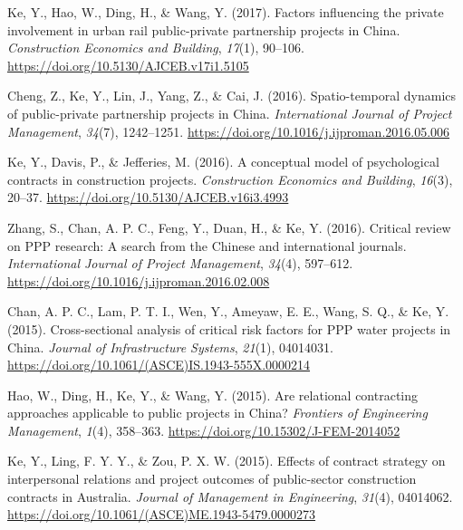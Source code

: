 \documentclass[11pt,a4paper]{report} %
\begin{document}
\begin{tablist}
        \item[2017] \tab{}Ke, Y., Hao, W., Ding, H., \& Wang, Y. (2017). Factors influencing the private involvement in urban rail public-private partnership projects in China. \textit{Construction Economics and Building}, \textit{17}(1), 90--106. \href{https://doi.org/10.5130/AJCEB.v17i1.5105}{https://doi.org/10.5130/AJCEB.v17i1.5105}
        
        \item[2016] \tab{}Cheng, Z., Ke, Y., Lin, J., Yang, Z., \& Cai, J. (2016). Spatio-temporal dynamics of public-private partnership projects in China. \textit{International Journal of Project Management}, \textit{34}(7), 1242--1251. \href{https://doi.org/10.1016/j.ijproman.2016.05.006}{https://doi.org/10.1016/j.ijproman.2016.05.006}
        
        \item[2016] \tab{}Ke, Y., Davis, P., \& Jefferies, M. (2016). A conceptual model of psychological contracts in construction projects. \textit{Construction Economics and Building}, \textit{16}(3), 20--37. \href{https://doi.org/10.5130/AJCEB.v16i3.4993}{https://doi.org/10.5130/AJCEB.v16i3.4993}
        
        \item[2016] \tab{}Zhang, S., Chan, A. P. C., Feng, Y., Duan, H., \& Ke, Y. (2016). Critical review on PPP research: A search from the Chinese and international journals. \textit{International Journal of Project Management}, \textit{34}(4), 597--612. \href{https://doi.org/10.1016/j.ijproman.2016.02.008}{https://doi.org/10.1016/j.ijproman.2016.02.008}
        
        \item[2015] \tab{}Chan, A. P. C., Lam, P. T. I., Wen, Y., Ameyaw, E. E., Wang, S. Q., \& Ke, Y. (2015). Cross-sectional analysis of critical risk factors for PPP water projects in China. \textit{Journal of Infrastructure Systems}, \textit{21}(1), 04014031. \href{https://doi.org/10.1061/(ASCE)IS.1943-555X.0000214}{https://doi.org/10.1061/(ASCE)IS.1943-555X.0000214}
        
        \item[2015] \tab{}Hao, W., Ding, H., Ke, Y., \& Wang, Y. (2015). Are relational contracting approaches applicable to public projects in China? \textit{Frontiers of Engineering Management}, \textit{1}(4), 358--363. \href{https://doi.org/10.15302/J-FEM-2014052}{https://doi.org/10.15302/J-FEM-2014052}
        
        \item[2015] \tab{}Ke, Y., Ling, F. Y. Y., \& Zou, P. X. W. (2015). Effects of contract strategy on interpersonal relations and project outcomes of public-sector construction contracts in Australia. \textit{Journal of Management in Engineering}, \textit{31}(4), 04014062. \href{https://doi.org/10.1061/(ASCE)ME.1943-5479.0000273}{https://doi.org/10.1061/(ASCE)ME.1943-5479.0000273}
        

\end{tablist}
\end{document}
